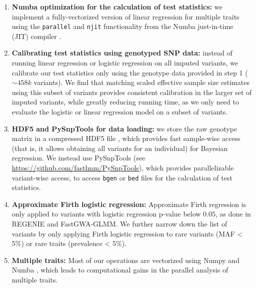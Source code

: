 \begin{enumerate}
    \item \textbf{Numba optimization for the calculation of test statistics:}
    we implement a fully-vectorized version of linear regression for multiple traits using the \texttt{parallel} and \texttt{njit} functionality from the Numba just-in-time (JIT) compiler \cite{lam2015numba}.
    \item \textbf{Calibrating test statistics using genotyped SNP data:}
    instead of running linear regression or logistic regression on all imputed variants, we calibrate our test statistics only using the genotype data provided in step 1 (${\sim}458k$ variants).
    We find that matching scaled effective sample size estimates using this subset of variants provides consistent calibration in the larger set of imputed variants, while greatly reducing running time, as we only need to evaluate the logistic or linear regression model on a subset of variants.
    \item \textbf{HDF5 and PySnpTools for data loading:}
    we store the raw genotype matrix in a compressed HDF5 file \cite{hdf5}, which provides fast sample-wise access (that is, it allows obtaining all variants for an individual) for Bayesian regression.
    We instead use PySnpTools (see \url{https://github.com/fastlmm/PySnpTools}), which provides parallelizable variant-wise access, to access \texttt{bgen} or \texttt{bed} files for the calculation of test statistics. 
    \item \textbf{Approximate Firth logistic regression:} Approximate Firth regression is only applied to variants with logistic regression p-value below $0.05$, as done in REGENIE and FastGWA-GLMM.
    We further narrow down the list of variants by only applying Firth logistic regression to rare variants (MAF < 5\%) or rare traits (prevalence < 5\%).
    \item \textbf{Multiple traits:} Most of our operations are vectorized using Numpy \cite{harris2020array} and Numba \cite{lam2015numba}, which leads to computational gains in the parallel analysis of multiple traits.
\end{enumerate}

